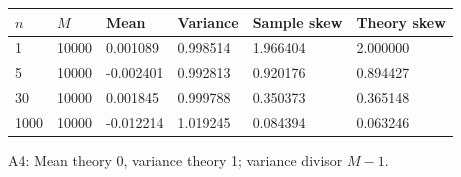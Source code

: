\begin{center}
\small
\begin{tabular}{llllll}
\toprule
$n$ & $M$ & Mean & Variance & Sample skew & Theory skew\\
\midrule
1 & 10000 & 0.001089 & 0.998514 & 1.966404 & 2.000000\\
5 & 10000 & -0.002401 & 0.992813 & 0.920176 & 0.894427\\
30 & 10000 & 0.001845 & 0.999788 & 0.350373 & 0.365148\\
1000 & 10000 & -0.012214 & 1.019245 & 0.084394 & 0.063246\\
\bottomrule
\end{tabular}
\par\smallskip A4: Mean theory 0, variance theory 1; variance divisor $M-1$.
\end{center}